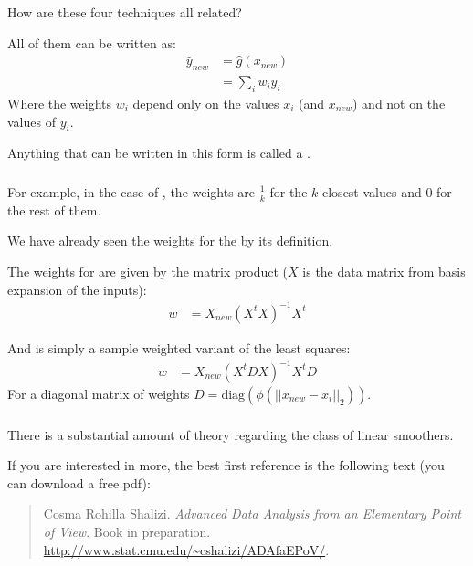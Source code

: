 \documentclass[xetex,mathserif,serif,aspectratio=169]{beamer}
\begin{document}
\begin{frame}[fragile] \frametitle{} \oldB \small


How are these four techniques all related?\pause

All of them can be written as:
\begin{align*}
\widehat{y}_{new} &= \widehat{g}(x_{new}) \\
&= \sum_i w_i y_i
\end{align*}
Where the weights $w_i$ depend only on the values $x_i$ (and $x_{new}$)
and not on the values of $y_i$.

\pause Anything that can be written in this form is called
a .

\end{frame}

\begin{frame}[fragile] \frametitle{} \oldB \small


For example, in the case of , the weights are $\frac{1}{k}$
for the $k$ closest values and $0$ for the rest of them.

\pause We have already seen the weights for the  by
its definition.

\pause The weights for  are given by the matrix
product ($X$ is the data matrix from basis expansion of the inputs):
\begin{align*}
w &= X_{new} (X^t X)^{-1} X^t
\end{align*}

\pause And  is simply a sample weighted variant of the least squares:
\begin{align*}
w &= X_{new} (X^t D X)^{-1} X^t D
\end{align*}
For a diagonal matrix of weights $D = \text{diag}\left(\phi(||x_{new} - x_i||_2)\right)$.

\end{frame}

\begin{frame}[fragile] \frametitle{} \oldB \small


There is a substantial amount of theory regarding the
class of linear smoothers.

If you are interested in more, the best first reference
is the following text (you can download a free pdf):
\begin{quote}
Cosma Rohilla Shalizi. \textit{Advanced Data Analysis from an Elementary Point of View}. Book in preparation. \url{http://www.stat.cmu.edu/~cshalizi/ADAfaEPoV/}.
\end{quote}

\end{frame}
\end{document}
